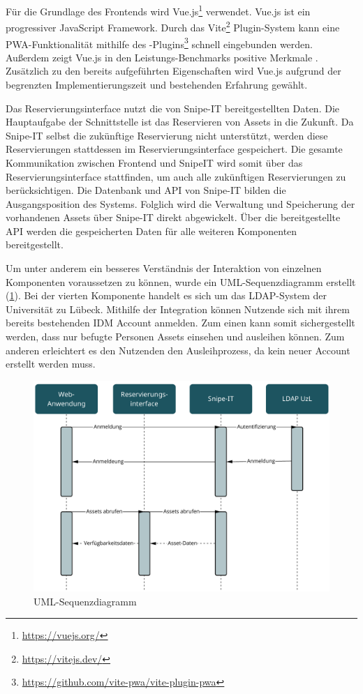 Für die Grundlage des Frontends wird Vue.js\footnote{\url{https://vuejs.org/}} verwendet. Vue.js ist
ein progressiver JavaScript Framework. Durch das Vite\footnote{\url{https://vitejs.dev/}}
Plugin-System kann eine PWA-Funktionalität mithilfe des
-Plugins\footnote{\url{https://github.com/vite-pwa/vite-plugin-pwa}}
schnell eingebunden werden. Außerdem zeigt Vue.js in den Leistungs-Benchmarks positive Merkmale
. Zusätzlich zu den bereits aufgeführten Eigenschaften wird Vue.js aufgrund
der begrenzten Implementierungszeit und bestehenden Erfahrung gewählt.

Das Reservierungsinterface nutzt die von Snipe-IT bereitgestellten Daten. Die Hauptaufgabe der
Schnittstelle ist das Reservieren von Assets in die Zukunft. Da Snipe-IT selbst die zukünftige
Reservierung nicht unterstützt, werden diese Reservierungen stattdessen im Reservierungsinterface
gespeichert. Die gesamte Kommunikation zwischen Frontend und SnipeIT wird somit über das
Reservierungsinterface stattfinden, um auch alle zukünftigen Reservierungen zu berücksichtigen. Die
Datenbank und API von Snipe-IT bilden die Ausgangsposition des Systems. Folglich wird die Verwaltung
und Speicherung der vorhandenen Assets über Snipe-IT direkt abgewickelt. Über die bereitgestellte
API werden die gespeicherten Daten für alle weiteren Komponenten bereitgestellt.

Um unter anderem ein besseres Verständnis der Interaktion von einzelnen Komponenten voraussetzen zu können, wurde
ein UML-Sequenzdiagramm erstellt (\ref{fig:uml}). Bei der vierten Komponente handelt es sich um das
LDAP-System der Universität zu Lübeck. Mithilfe der Integration können Nutzende sich mit ihrem bereits
bestehenden IDM Account anmelden. Zum einen kann somit sichergestellt werden, dass nur befugte
Personen Assets einsehen und ausleihen können. Zum anderen erleichtert es den Nutzenden den
Ausleihprozess, da kein neuer Account erstellt werden muss.

\begin{figure}[h]
    \centering
    \includegraphics[scale=0.45]{Bilder/uml.pdf}
    \caption[UML-Sequenzdiagramm]{UML-Sequenzdiagramm}
    \label{fig:uml}
\end{figure}

